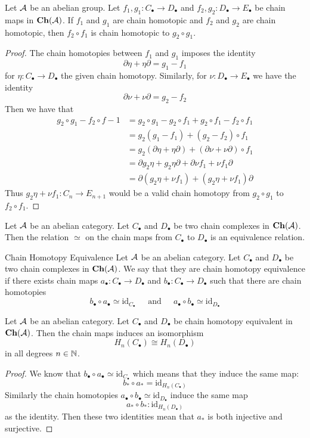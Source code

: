 \documentclass[a4paper]{article}
\begin{document}
\begin{prp}{}{} Let $\mathcal{A}$ be an abelian group. Let $f_1,g_1:C_\bullet\to D_\bullet$ and $f_2,g_2:D_\bullet\to E_\bullet$ be chain maps in $\bold{Ch}(\mathcal{A})$. If $f_1$ and $g_1$ are chain homotopic and $f_2$ and $g_2$ are chain homotopic, then $f_2\circ f_1$ is chain homotopic to $g_2\circ g_1$. \tcbline
\begin{proof}
The chain homotopies between $f_1$ and $g_1$ imposes the identity $$\partial\eta+\eta\partial=g_1-f_1$$ for $\eta:C_\bullet\to D_\bullet$ the given chain homotopy. Similarly, for $\nu:D_\bullet\to E_\bullet$ we have the identity $$\partial\nu+\nu\partial=g_2-f_2$$ Then we have that 
\begin{align*}
g_2\circ g_1-f_2\circ f-1&=g_2\circ g_1-g_2\circ f_1+g_2\circ f_1-f_2\circ f_1\\
&=g_2(g_1-f_1)+(g_2-f_2)\circ f_1\\
&=g_2(\partial\eta+\eta\partial)+(\partial\nu+\nu\partial)\circ f_1\\
&=\partial g_2\eta+g_2\eta\partial+\partial\nu f_1+\nu f_1\partial\\
&=\partial(g_2\eta+\nu f_1)+(g_2\eta+\nu f_1)\partial
\end{align*}
Thus $g_2\eta+\nu f_1:C_n\to E_{n+1}$ would be a valid chain homotopy from $g_2\circ g_1$ to $f_2\circ f_1$. 
\end{proof}
\end{prp}

\begin{lmm}{}{} Let $\mathcal{A}$ be an abelian category. Let $C_\bullet$ and $D_\bullet$ be two chain complexes in $\bold{Ch}(\mathcal{A})$. Then the relation $\simeq$ on the chain maps from $C_\bullet$ to $D_\bullet$ is an equivalence relation. 
\end{lmm}

\begin{defn}{Chain Homotopy Equivalence}{} Let $\mathcal{A}$ be an abelian category. Let $C_\bullet$ and $D_\bullet$ be two chain complexes in $\bold{Ch}(\mathcal{A})$. We say that they are chain homotopy equivalence if there exists chain maps $a_\bullet:C_\bullet\to D_\bullet$ and $b_\bullet:C_\bullet\to D_\bullet$ such that there are chain homotopies $$b_\bullet\circ a_\bullet\simeq\text{id}_{C_\bullet}\;\;\;\;\text{ and }\;\;\;\;a_\bullet\circ b_\bullet\simeq\text{id}_{D_\bullet}$$
\end{defn}

\begin{lmm}{}{} Let $\mathcal{A}$ be an abelian category. Let $C_\bullet$ and $D_\bullet$ be chain homotopy equivalent in $\bold{Ch}(\mathcal{A})$. Then the chain maps induces an isomorphism $$H_n(C_\bullet)\cong H_n(D_\bullet)$$ in all degrees $n\in\mathbb{N}$. \tcbline
\begin{proof}
We know that $b_\bullet\circ a_\bullet\simeq\text{id}_{C_\bullet}$ which means that they induce the same map: $$b_\ast\circ a_\ast=\text{id}_{H_n(C_\bullet)}$$ Similarly the chain homotopies $a_\bullet\circ b_\bullet\simeq\text{id}_{D_\bullet}$ induce the same map $$a_\ast\circ b_\ast:\text{id}_{H_n(D_\bullet)}$$ as the identity. Then these two identities mean that $a_\ast$ is both injective and surjective. 
\end{proof}
\end{lmm}
\end{document}
